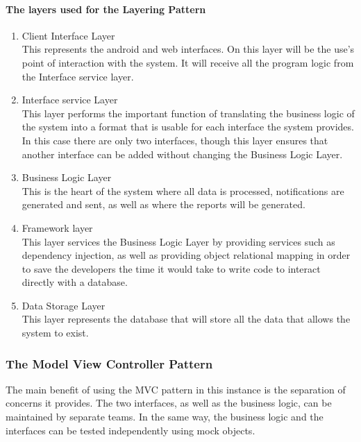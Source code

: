 \documentclass{article}
\begin{document}
\paragraph{The layers used for the Layering Pattern}
\begin{enumerate}
	\item Client Interface Layer \\
	This represents the android and web interfaces. On this layer will be the use's point of interaction with the system. It will receive all the program logic from the Interface service layer.
	\item Interface service Layer \\
	This layer performs the important function of translating the business logic of the system into a format that is usable for each interface the system provides. In this case there are only two interfaces, though this layer ensures that another interface can be added without changing the Business Logic Layer.
	\item Business Logic Layer \\
	This is the heart of the system where all data is processed, notifications are generated and sent, as well as where the reports will be generated.
	\item Framework layer \\
	This layer services the Business Logic Layer by providing services such as dependency injection, as well as providing object relational mapping in order to save the developers the time it would take to write code to interact directly with a database.
	\item Data Storage Layer \\
	This layer represents the database that will store all the data that allows the system to exist.
\end{enumerate}

\subsubsection{The Model View Controller Pattern}
The main benefit of using the MVC pattern in this instance is the separation of concerns it provides. The two interfaces, as well as the business logic, can be maintained by separate teams. In the same way, the business logic and the interfaces can be tested independently using mock objects.
\end{document}
